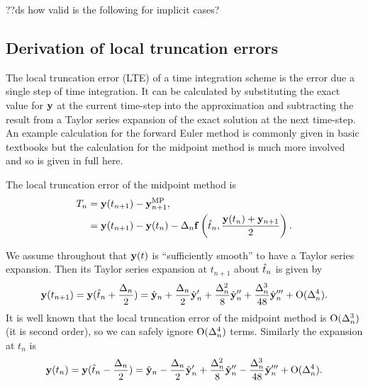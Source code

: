 
??ds how valid is the following for implicit cases?

\subsection{Derivation of local truncation errors}

The local truncation error (LTE) of a time integration scheme is the error due a single step of time integration.
It can be calculated by substituting the exact value for $\mathbf{y}$ at the current time-step into the approximation and subtracting the result from a Taylor series expansion of the exact solution at the next time-step.
An example calculation for the forward Euler method is commonly given in basic textbooks but the calculation for the midpoint method is much more involved and so is given in full here.

The local truncation error of the midpoint method is
\begin{align}
  T_n &= \mathbf{y}(t_{n+1}) - \mathbf{y}_{n+1}^{\text{MP}}, \notag\\
  &= \mathbf{y}(t_{n+1}) - \mathbf{y}(t_n) - \Delta_{n} {\mathbf{f}}\left( \hat{t}_n, \frac{\mathbf{y}(t_n) + \mathbf{y}_{n+1}}{2} \right).
  \label{eq:trunc-start}
\end{align}

We assume throughout that $\mathbf{y}(t)$ is ``sufficiently smooth'' to have a Taylor series expansion. Then its Taylor series expansion at $t_{n+1}$ about $\hat{t}_n$ is given by
\begin{equation}
  \mathbf{y}(t_{n+1}) = \mathbf{y}(\hat{t}_n + \frac{\Delta_{n}}{2}) = \hat{\mathbf{y}}_n + \frac{\Delta_{n}}{2} \hat{\mathbf{y}}_n' + \frac{\Delta_{n}^2}{8} \hat{\mathbf{y}}_n'' + \frac{\Delta_{n}^3}{48} \hat{\mathbf{y}}_n''' + \text{O}(\Delta_{n}^4).
  \label{eq:taylornp1}
\end{equation}
It is well known that the local truncation error of the midpoint method is $\text{O}(\Delta_{n}^3)$ (\ie it is second order)\cite{??ds}, so we can safely ignore $\text{O}(\Delta_{n}^4)$ terms.
Similarly the expansion at $t_n$ is
\begin{equation}
  \mathbf{y}(t_n) = \mathbf{y}(\hat{t}_n - \frac{\Delta_{n}}{2}) = \hat{\mathbf{y}}_n - \frac{\Delta_{n}}{2} \hat{\mathbf{y}}_n' + \frac{\Delta_{n}^2}{8} \hat{\mathbf{y}}_n'' - \frac{\Delta_{n}^3}{48} \hat{\mathbf{y}}_n''' + \text{O}(\Delta_{n}^4).
  \label{eq:taylorn}
\end{equation}

